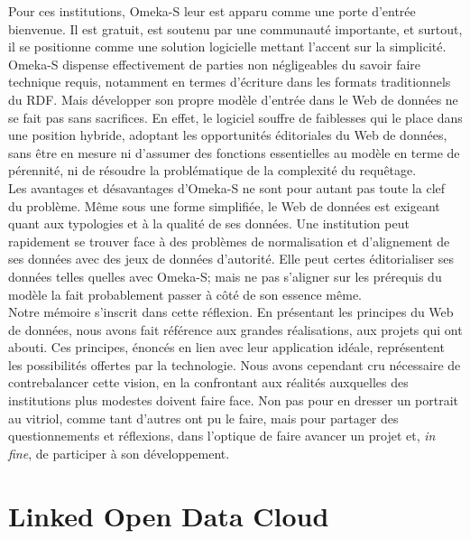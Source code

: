 \documentclass[a4paper,12pt,twoside]{book}
\begin{document}
Pour ces institutions, Omeka-S leur est apparu comme une porte d'entrée bienvenue. Il est gratuit, est soutenu par une communauté importante, et surtout, il se positionne comme une solution logicielle mettant l'accent sur la simplicité. Omeka-S dispense effectivement de parties non négligeables du savoir faire technique requis, notamment en termes d'écriture dans les formats traditionnels du RDF. Mais développer son propre modèle d'entrée dans le Web de données ne se fait pas sans sacrifices. En effet, le logiciel souffre de faiblesses qui le place dans une position hybride, adoptant les opportunités éditoriales du Web de données, sans être en mesure ni d'assumer des fonctions essentielles au modèle en terme de pérennité, ni de résoudre la problématique de la complexité du requêtage.\\

Les avantages et désavantages d'Omeka-S ne sont pour autant pas toute la clef du problème. Même sous une forme simplifiée, le Web de données est exigeant quant aux typologies et à la qualité de ses données. Une institution peut rapidement se trouver face à des problèmes de normalisation et d'alignement de ses données avec des jeux de données d'autorité. Elle peut certes éditorialiser ses données telles quelles avec Omeka-S; mais ne pas s'aligner sur les prérequis du modèle la fait probablement passer à côté de son essence même.\\

Notre mémoire s'inscrit dans cette réflexion. En présentant les principes du Web de données, nous avons fait référence aux grandes réalisations, aux projets qui ont abouti. Ces principes, énoncés en lien avec leur application idéale, représentent les possibilités offertes par la technologie. Nous avons cependant cru nécessaire de contrebalancer cette vision, en la confrontant aux réalités auxquelles des institutions plus modestes doivent faire face. Non pas pour en dresser un portrait au vitriol, comme tant d'autres ont pu le faire, mais pour partager des questionnements et réflexions, dans l'optique de faire avancer un projet et, \textit{in fine}, de participer à son développement. 



 
	
	\appendix
        \chapter{Linked Open Data Cloud}
\end{document}
